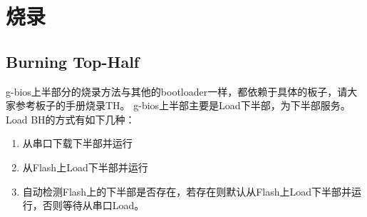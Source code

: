 \section{烧录}
\subsection{Burning Top-Half}
g-bios上半部分的烧录方法与其他的bootloader一样，都依赖于具体的板子，请大家参考板子的手册烧录TH。
g-bios上半部主要是Load下半部，为下半部服务。Load BH的方式有如下几种：
\begin{enumerate} \setlength{\itemsep}{-\itemsep}
\item 从串口下载下半部并运行
\item 从Flash上Load下半部并运行
\item 自动检测Flash上的下半部是否存在，若存在则默认从Flash上Load下半部并运行，否则等待从串口Load。
\end{enumerate}

